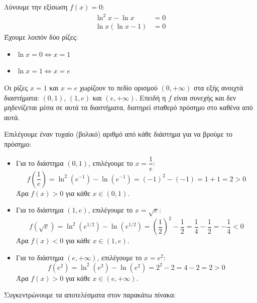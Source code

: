 Λύνουμε την εξίσωση $f(x) = 0$:
\begin{align*}
    \ln^2 x - \ln x &= 0 \\
    \ln x (\ln x - 1) &= 0
\end{align*}
Έχουμε λοιπόν δύο ρίζες:
\begin{itemize}
    \item $\ln x = 0 \Leftrightarrow x = 1$
    \item $\ln x = 1 \Leftrightarrow x = e$
\end{itemize}

Οι ρίζες $x=1$ και $x=e$ χωρίζουν το πεδίο ορισμού $(0, +\infty)$ στα εξής ανοιχτά διαστήματα: $(0, 1)$, $(1, e)$ και $(e, +\infty)$. Επειδή η $f$ είναι συνεχής και δεν μηδενίζεται μέσα σε αυτά τα διαστήματα, διατηρεί σταθερό πρόσημο στο καθένα από αυτά.

Επιλέγουμε έναν τυχαίο (βολικό) αριθμό από κάθε διάστημα για να βρούμε το πρόσημο:
\begin{itemize}
    \item Για το διάστημα $(0, 1)$, επιλέγουμε το $x = \dfrac{1}{e}$:
    \[ f\left(\dfrac{1}{e}\right) = \ln^2\left(e^{-1}\right) - \ln\left(e^{-1}\right) = (-1)^2 - (-1) = 1 + 1 = 2 > 0 \]
    Άρα $f(x) > 0$ για κάθε $x \in (0, 1)$.
    
    \item Για το διάστημα $(1, e)$, επιλέγουμε το $x = \sqrt{e}$:
    \[ f(\sqrt{e}) = \ln^2\left(e^{1/2}\right) - \ln\left(e^{1/2}\right) = \left(\dfrac{1}{2}\right)^2 - \dfrac{1}{2} = \dfrac{1}{4} - \dfrac{1}{2} = -\dfrac{1}{4} < 0 \]
    Άρα $f(x) < 0$ για κάθε $x \in (1, e)$.
    
    \item Για το διάστημα $(e, +\infty)$, επιλέγουμε το $x = e^2$:
    \[ f(e^2) = \ln^2\left(e^2\right) - \ln\left(e^2\right) = 2^2 - 2 = 4 - 2 = 2 > 0 \]
    Άρα $f(x) > 0$ για κάθε $x \in (e, +\infty)$.
\end{itemize}

Συγκεντρώνουμε τα αποτελέσματα στον παρακάτω πίνακα:
\begin{center}
\end{center}

